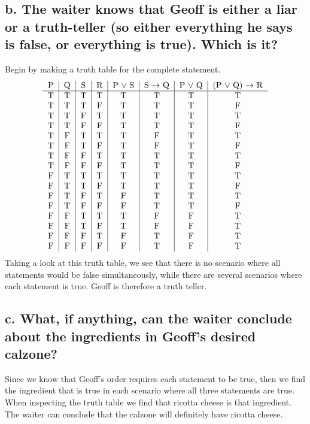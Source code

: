\documentclass[11pt]{article}
\begin{document}
\subsection*{b. The waiter knows that Geoff is either a liar or a truth-teller (so either everything he says is false, or everything is true). Which is it?}
Begin by making a truth table for the complete statement.
\[
\begin{tabular}{c|c|c|c|c|c|c|c}
P & Q & S & R & P $\lor$ S & S $\rightarrow$ Q & P $\lor$ Q & (P $\lor$ Q) $\rightarrow$ R \\ \hline
T & T & T & T & T & T & T & T\\
T & T & T & F & T & T & T & F\\
T & T & F & T & T & T & T & T\\
T & T & F & F & T & T & T & F\\
T & F & T & T & T & F & T & T\\
T & F & T & F & T & F & T & F\\
T & F & F & T & T & T & T & T\\
T & F & F & F & T & T & T & F\\
F & T & T & T & T & T & T & T\\
F & T & T & F & T & T & T & F\\
F & T & F & T & F & T & T & T\\
F & T & F & F & F & T & T & F\\
F & F & T & T & T & F & F & T\\
F & F & T & F & T & F & F & T\\
F & F & F & T & F & T & F & T\\
F & F & F & F & F & T & F & T\\
\end{tabular}
\]
Taking a look at this truth table, we see that there is no scenario where all statements would be false simultaneously, while there are several scenarios where each statement is true. Geoff is therefore a truth teller.

\subsection*{c. What, if anything, can the waiter conclude about the ingredients in Geoff's desired calzone?}
Since we know that Geoff's order requires each statement to be true, then we find the ingredient that is true in each scenario where all three statements are true. When inspecting the truth table we find that ricotta cheese is that ingredient. The waiter can conclude that the calzone will definitely have ricotta cheese.
\end{document}
